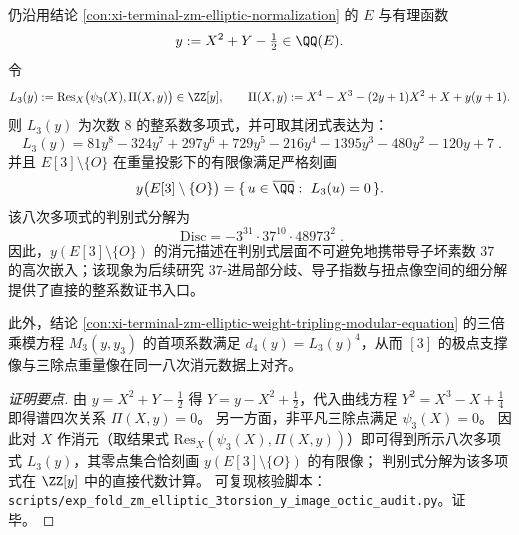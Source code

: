 \begin{conclusion}\label{con:xi-terminal-zm-elliptic-3torsion-y-image-octic}
仍沿用结论 \ref{con:xi-terminal-zm-elliptic-normalization} 的 \(E\) 与有理函数
\[
y:=X^{2}+Y-\tfrac12\in\QQ(E).
\]
令
\[
L_{3}(y):=\mathrm{Res}_{X}\bigl(\psi_{3}(X),\Pi(X,y)\bigr)\in\ZZ[y],
\qquad
\Pi(X,y):=X^{4}-X^{3}-(2y+1)X^{2}+X+y(y+1).
\]
则 \(L_{3}(y)\) 为次数 \(8\) 的整系数多项式，并可取其闭式表达为：
\[
\boxed{\;
L_{3}(y)=81 y^{8}-324 y^{7}+297 y^{6}+729 y^{5}-216 y^{4}-1395 y^{3}-480 y^{2}-120 y+7\; }.
\]
并且 \(E[3]\setminus\{O\}\) 在重量投影下的有限像满足严格刻画
\[
y\bigl(E[3]\setminus\{O\}\bigr)=\{\,u\in\overline{\QQ}:\ L_{3}(u)=0\,\}.
\]
该八次多项式的判别式分解为
\[
\boxed{\;
\mathrm{Disc}=-3^{31}\cdot 37^{10}\cdot 48973^{2}\; }.
\]
因此，\(y(E[3]\setminus\{O\})\) 的消元描述在判别式层面不可避免地携带导子坏素数 \(37\) 的高次嵌入；该现象为后续研究 \(37\)-进局部分歧、导子指数与扭点像空间的细分解提供了直接的整系数证书入口。
\par
此外，结论 \ref{con:xi-terminal-zm-elliptic-weight-tripling-modular-equation} 的三倍乘模方程 \(M_{3}(y,y_{3})\) 的首项系数满足 \(d_{4}(y)=L_{3}(y)^{4}\)，从而 \([3]\) 的极点支撑像与三除点重量像在同一八次消元数据上对齐。
\end{conclusion}
\begin{proof}[证明要点]
由 \(y=X^{2}+Y-\tfrac12\) 得
\(
Y=y-X^{2}+\tfrac12
\)，代入曲线方程 \(Y^{2}=X^{3}-X+\tfrac14\) 即得谱四次关系 \(\Pi(X,y)=0\)。
另一方面，非平凡三除点满足 \(\psi_3(X)=0\)。
因此对 \(X\) 作消元（取结果式 \(\mathrm{Res}_X(\psi_3(X),\Pi(X,y))\)）即可得到所示八次多项式 \(L_3(y)\)，其零点集合恰刻画 \(y(E[3]\setminus\{O\})\) 的有限像；
判别式分解为该多项式在 \(\ZZ[y]\) 中的直接代数计算。
可复现核验脚本：\texttt{scripts/exp\_fold\_zm\_elliptic\_3torsion\_y\_image\_octic\_audit.py}。证毕。
\end{proof}

